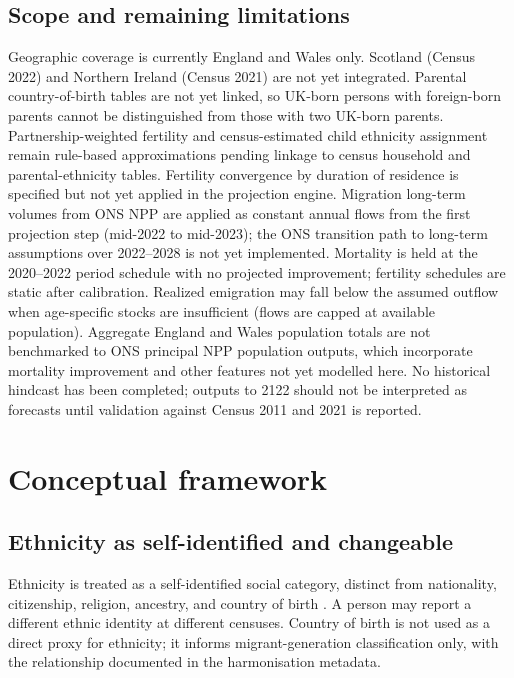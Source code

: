 \documentclass[12pt,a4paper]{article}
\begin{document}
\subsection{Scope and remaining limitations}

Geographic coverage is currently England and Wales only. Scotland (Census 2022) and
Northern Ireland (Census 2021) are not yet integrated. Parental country-of-birth tables are
not yet linked, so UK-born persons with foreign-born parents cannot be distinguished from
those with two UK-born parents. Partnership-weighted fertility and census-estimated child
ethnicity assignment remain rule-based approximations pending linkage to census household
and parental-ethnicity tables. Fertility convergence by duration of residence is specified
but not yet applied in the projection engine. Migration long-term volumes from ONS NPP are
applied as constant annual flows from the first projection step (mid-2022 to mid-2023); the
ONS transition path to long-term assumptions over 2022--2028 is not yet implemented.
Mortality is held at the 2020--2022 period schedule with no projected improvement; fertility
schedules are static after calibration. Realized emigration may fall below the assumed outflow
when age-specific stocks are insufficient (flows are capped at available population). Aggregate
England and Wales population totals are not benchmarked to ONS principal NPP population
outputs, which incorporate mortality improvement and other features not yet modelled here.
No historical hindcast has been completed; outputs to 2122 should not be interpreted as
forecasts until validation against Census 2011 and 2021 is reported.

\section{Conceptual framework}

\subsection{Ethnicity as self-identified and changeable}

Ethnicity is treated as a self-identified social category, distinct from nationality,
citizenship, religion, ancestry, and country of birth \citep{ons2021ethnicity, ons2023rm032}.
A person may report a different ethnic identity at different censuses. Country of birth is
not used as a direct proxy for ethnicity; it informs migrant-generation classification only,
with the relationship documented in the harmonisation metadata.
\end{document}
